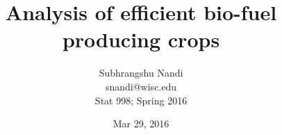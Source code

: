 \documentclass[12pt]{article}
\begin{document}
\title{Analysis of efficient bio-fuel producing crops}

\author{Subhrangshu Nandi \\
	snandi@wisc.edu \\	
	Stat 998; Spring 2016}
\date{Mar 29, 2016}

\maketitle






%


\newpage
\begin{appendix}

\end{appendix}
\end{document}
